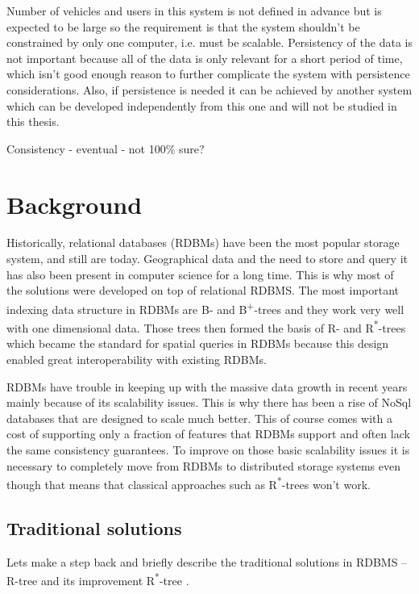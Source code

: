 \documentclass[times, utf8, diplomski]{fer}
\newcommand{\bplus}{B\textsuperscript{+}}
\newcommand{\rstar}{R\textsuperscript{*}}
\begin{document}
Number of vehicles and users in this system is not defined in advance but is expected to be large so the requirement is that the system shouldn't be constrained by only one computer, i.e. must be scalable. Persistency of the data is not important because all of the data is only relevant for a short period of time, which isn't good enough reason to further complicate the system with persistence considerations. Also, if persistence is needed it can be achieved by another system which can be developed independently from this one and will not be studied in this thesis. 

Consistency - eventual - not 100\% sure?

\chapter{Background}
Historically, relational databases (RDBMs) have been the most popular storage system, and still are today. Geographical data and the need to store and query it has also been present in computer science for a long time. This is why most of the solutions were developed on top of relational RDBMS. The most important indexing data structure in RDBMs are B- and \bplus-trees and they work very well with one dimensional data. Those trees then formed the basis of R- and \rstar-trees which became the standard for spatial queries in RDBMs because this design enabled great interoperability with existing RDBMs.

RDBMs have trouble in keeping up with the massive data growth in recent years mainly because of its scalability issues. This is why there has been a rise of NoSql databases that are designed to scale much better. This of course comes with a cost of supporting only a fraction of features that RDBMs support and often lack the same consistency guarantees. To improve on those basic scalability issues it is necessary to completely move from RDBMs to distributed storage systems even though that means that classical approaches such as \rstar-trees won't work.

\section{Traditional solutions}
Lets make a step back and briefly describe the traditional solutions in RDBMS -- R-tree \cite{rtree} and its improvement \rstar-tree \cite{rstar}.
\end{document}
